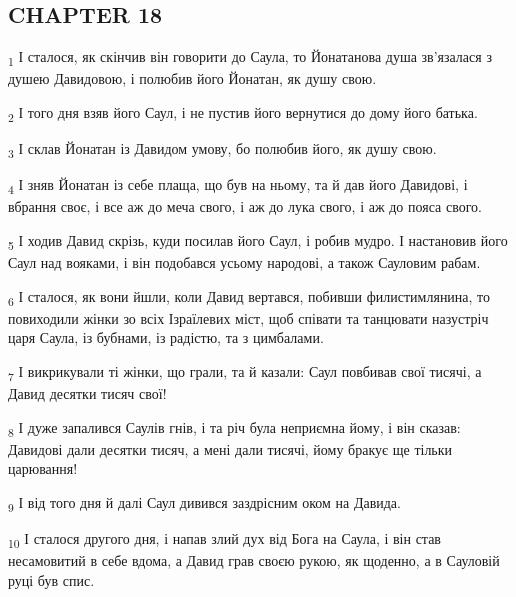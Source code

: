 \subsection{CHAPTER 18}
\begin{tcolorbox}
\textsubscript{1} І сталося, як скінчив він говорити до Саула, то Йонатанова душа зв'язалася з душею Давидовою, і полюбив його Йонатан, як душу свою.
\end{tcolorbox}
\begin{tcolorbox}
\textsubscript{2} І того дня взяв його Саул, і не пустив його вернутися до дому його батька.
\end{tcolorbox}
\begin{tcolorbox}
\textsubscript{3} І склав Йонатан із Давидом умову, бо полюбив його, як душу свою.
\end{tcolorbox}
\begin{tcolorbox}
\textsubscript{4} І зняв Йонатан із себе плаща, що був на ньому, та й дав його Давидові, і вбрання своє, і все аж до меча свого, і аж до лука свого, і аж до пояса свого.
\end{tcolorbox}
\begin{tcolorbox}
\textsubscript{5} І ходив Давид скрізь, куди посилав його Саул, і робив мудро. І настановив його Саул над вояками, і він подобався усьому народові, а також Сауловим рабам.
\end{tcolorbox}
\begin{tcolorbox}
\textsubscript{6} І сталося, як вони йшли, коли Давид вертався, побивши филистимлянина, то повиходили жінки зо всіх Ізраїлевих міст, щоб співати та танцювати назустріч царя Саула, із бубнами, із радістю, та з цимбалами.
\end{tcolorbox}
\begin{tcolorbox}
\textsubscript{7} І викрикували ті жінки, що грали, та й казали: Саул повбивав свої тисячі, а Давид десятки тисяч свої!
\end{tcolorbox}
\begin{tcolorbox}
\textsubscript{8} І дуже запалився Саулів гнів, і та річ була неприємна йому, і він сказав: Давидові дали десятки тисяч, а мені дали тисячі, йому бракує ще тільки царювання!
\end{tcolorbox}
\begin{tcolorbox}
\textsubscript{9} І від того дня й далі Саул дивився заздрісним оком на Давида.
\end{tcolorbox}
\begin{tcolorbox}
\textsubscript{10} І сталося другого дня, і напав злий дух від Бога на Саула, і він став несамовитий в себе вдома, а Давид грав своєю рукою, як щоденно, а в Сауловій руці був спис.
\end{tcolorbox}
